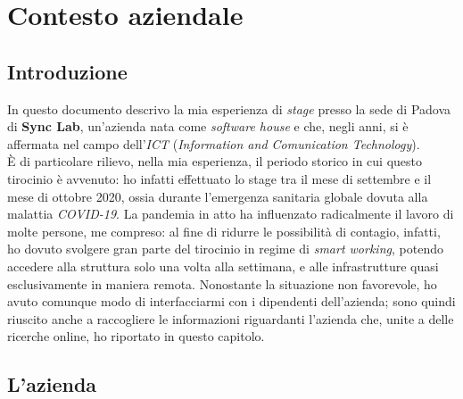 
\chapter{Contesto aziendale}
\label{cap:contesto-aziendale}

%
%

\section{Introduzione}

In questo documento descrivo la mia esperienza di \textit{stage} presso la sede di Padova di \textbf{Sync Lab}, un'azienda nata come \textit{software house} e che, negli anni, si è affermata nel campo dell'\textit{ICT} (\textit{Information and Comunication Technology}).\\
È di particolare rilievo, nella mia esperienza, il periodo storico in cui questo tirocinio è avvenuto: ho infatti effettuato lo stage tra il mese di settembre e il mese di ottobre 2020, ossia durante l'emergenza sanitaria globale dovuta alla malattia \textit{COVID-19}. La pandemia in atto ha influenzato radicalmente il lavoro di molte persone, me compreso: al fine di ridurre le possibilità di contagio, infatti, ho dovuto svolgere gran parte del tirocinio in regime di \textit{smart working}, potendo accedere alla struttura solo una volta alla settimana, e alle infrastrutture quasi esclusivamente in maniera remota.
Nonostante la situazione non favorevole, ho avuto comunque modo di interfacciarmi con i dipendenti dell'azienda; sono quindi riuscito anche a raccogliere le informazioni riguardanti l'azienda che, unite a delle ricerche online, ho riportato in questo capitolo.

\section{L'azienda}


